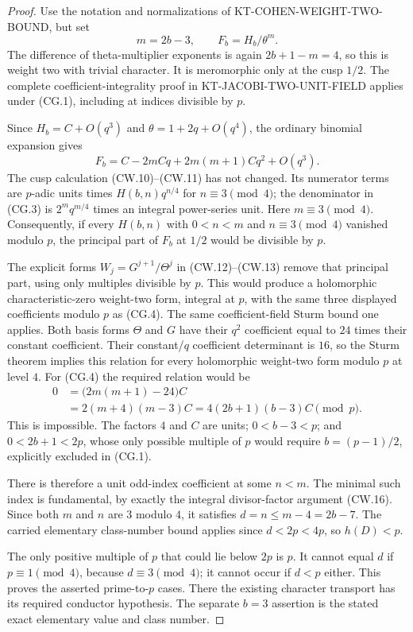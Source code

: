 \documentclass[11pt,a4paper]{article}
\theoremstyle{definition}
\begin{document}
\begin{proof}
Use the notation and normalizations of
KT-COHEN-WEIGHT-TWO-BOUND, but set
\[
                  m=2b-3,\qquad F_b=H_b/\theta^m.
 \tag{CG.3}
\]
The difference of theta-multiplier exponents is again
$2b+1-m=4$, so this is weight two with trivial character.
It is meromorphic only at the cusp $1/2$.
The complete coefficient-integrality proof in
KT-JACOBI-TWO-UNIT-FIELD applies under (CG.1), including
at indices divisible by $p$.

Since $H_b=C+O(q^3)$ and $\theta=1+2q+O(q^4)$,
the ordinary binomial expansion gives
\[
 F_b=C-2mCq+2m(m+1)Cq^2+O(q^3).
 \tag{CG.4}
\]
The cusp calculation (CW.10)--(CW.11) has not changed.
Its numerator terms are $p$-adic units times
$H(b,n)q^{n/4}$ for $n\equiv3\pmod4$;
the denominator in (CG.3) is $2^m q^{m/4}$ times
an integral power-series unit.  Here $m\equiv3\pmod4$.
Consequently, if every $H(b,n)$ with $0<n<m$ and
$n\equiv3\pmod4$ vanished modulo $p$, the principal
part of $F_b$ at $1/2$ would be divisible by $p$.

The explicit forms $W_j=G^{j+1}/\Theta^j$ in
(CW.12)--(CW.13) remove that principal part, using only
multiples divisible by $p$.  This would produce a
holomorphic characteristic-zero weight-two form, integral
at $p$, with the same three displayed coefficients modulo
$p$ as (CG.4).  The same coefficient-field Sturm bound
one applies.
Both basis forms $\Theta$ and $G$ have their $q^2$
coefficient equal to $24$ times their constant coefficient.
Their constant/$q$ coefficient determinant is $16$, so
the Sturm theorem implies this relation for every
holomorphic weight-two form modulo $p$ at level $4$.
For (CG.4) the required relation would be
\[
 \begin{aligned}
 0&=\bigl(2m(m+1)-24\bigr)C\\
  &=2(m+4)(m-3)C
    =4(2b+1)(b-3)C\pmod p.
 \end{aligned}
 \tag{CG.5}
\]
This is impossible.  The factors $4$ and $C$ are units;
$0<b-3<p$; and $0<2b+1<2p$, whose only possible
multiple of $p$ would require $b=(p-1)/2$, explicitly
excluded in (CG.1).

There is therefore a unit odd-index coefficient at some
$n<m$.  The minimal such index is fundamental, by exactly
the integral divisor-factor argument (CW.16).
Since both $m$ and $n$ are $3$ modulo $4$, it satisfies
$d=n\leq m-4=2b-7$.
The carried elementary class-number bound applies since
$d<2p<4p$, so $h(D)<p$.

The only positive multiple of $p$ that could lie below
$2p$ is $p$.  It cannot equal $d$ if $p\equiv1\pmod4$,
because $d\equiv3\pmod4$; it cannot occur if $d<p$
either.  This proves the asserted prime-to-$p$ cases.
There the existing character transport has its required
conductor hypothesis.  The separate $b=3$ assertion is
the stated exact elementary value and class number.
\end{proof}
\end{document}
